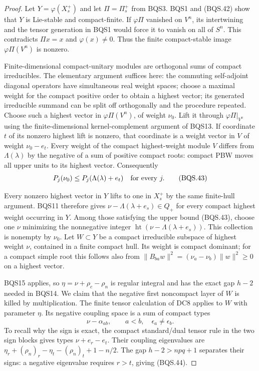 \documentclass[11pt,a4paper]{article}
\numberwithin{equation}{section}
\theoremstyle{remark}\newtheorem{remark}[theorem]{Remark}
\begin{document}
\begin{proof}
Let $Y=\varphi(X_s^+)$ and let $\Pi=\Pi_s^+$ from BQS3.
BQS1 and (BQS.42) show that $Y$ is Lie-stable and compact-finite.
If $\varphi\Pi$ vanished on $V^n$, its intertwining and the tensor
generation in BQS1 would force it to vanish on all of $S^n$.
This contradicts $\Pi x=x$ and $\varphi(x)\ne0$.
Thus the finite compact-stable image $\varphi\Pi(V^n)$ is nonzero.

Finite-dimensional compact-unitary modules are orthogonal sums of
compact irreducibles.  The elementary argument suffices here:
the commuting self-adjoint diagonal operators have simultaneous real
weight spaces; choose a maximal weight for the compact positive order
to obtain a highest vector; its generated irreducible summand can be
split off orthogonally and the procedure repeated.
Choose such a highest vector in $\varphi\Pi(V^n)$, of weight $\nu_0$.
Lift it through $\varphi\Pi|_{V^n}$ using the finite-dimensional
kernel-complement argument of BQS13.
If coordinate $t$ of its nonzero highest lift is nonzero, that coordinate
is a weight vector in $V$ of weight $\nu_0-e_t$.
Every weight of the compact highest-weight module $V$ differs from
$\Lambda(\lambda)$ by the negative of a sum of positive compact roots:
compact PBW moves all upper units to its highest vector.
Consequently
\[
              P_j(\nu_0)\le P_j(\Lambda(\lambda)+e_t)
                         \quad\hbox{for every }j .
 \tag{BQS.43}
\]

Every nonzero highest vector in $Y$ lifts to one in $X_s^+$ by the
same finite-hull argument.  BQS11 therefore gives
$\nu-\Lambda(\lambda+e_s)\in Q_+$ for every compact highest weight
occurring in $Y$.
Among those satisfying the upper bound (BQS.43), choose one $\nu$
minimizing the nonnegative integer
$\operatorname{ht}(\nu-\Lambda(\lambda+e_s))$.
This collection is nonempty by $\nu_0$.
Let $W\subset Y$ be a compact irreducible subspace of highest weight
$\nu$, contained in a finite compact hull.
Its weight is compact dominant; for a compact simple root this follows
also from
$\|B_{ba}w\|^2=(\nu_a-\nu_b)\|w\|^2\ge0$ on a highest vector.

BQS15 applies, so
$\eta=\nu+\rho_c-\rho_n$ is regular integral and has the exact gap
$h-2$ needed in BQS14.
We claim that the negative first noncompact layer of $W$ is killed
by multiplication.
The finite tensor calculation of DC8 applies to $W$ with parameter
$\eta$.  Its negative coupling space is a sum of compact types
\[
                   \nu-\alpha_{ab},
             \qquad a<b,\quad\epsilon_a\ne\epsilon_b.
 \tag{BQS.44}
\]
To recall why the sign is exact, the compact standard/dual tensor rule
in the two sign blocks gives types $\nu+e_r-e_t$.
Their coupling eigenvalues are
$\eta_r+(\rho_n)_r-\eta_t-(\rho_n)_t+1-n/2$.
The gap $h-2>npq+1$ separates their signs: a negative eigenvalue
requires $r>t$, giving (BQS.44).


\end{proof}
\end{document}
